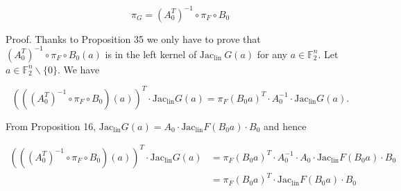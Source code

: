 \documentclass[10pt]{article}
\begin{document}
$$
\pi_{G}=\left(A_{0}^{T}\right)^{-1} \circ \pi_{F} \circ B_{0}
$$

Proof. Thanks to Proposition 35 we only have to prove that $\left(A_{0}^{T}\right)^{-1} \circ \pi_{F} \circ B_{0}(a)$ is in the left kernel of $\mathrm{Jac}_{\text {lin }} G(a)$ for any $a \in \mathbb{F}_{2}^{n}$. Let $a \in \mathbb{F}_{2}^{n} \backslash\{0\}$. We have

$$
\left(\left(\left(A_{0}^{T}\right)^{-1} \circ \pi_{F} \circ B_{0}\right)(a)\right)^{T} \cdot \mathrm{Jac}_{\mathrm{lin}} G(a)=\pi_{F}\left(B_{0} a\right)^{T} \cdot A_{0}^{-1} \cdot \mathrm{Jac}_{\mathrm{lin}} G(a) .
$$

From Proposition 16, $\mathrm{Jac}_{\operatorname{lin}} G(a)=A_{0} \cdot \mathrm{Jac}_{\operatorname{lin}} F\left(B_{0} a\right) \cdot B_{0}$ and hence

$$
\begin{aligned}
\left(\left(\left(A_{0}^{T}\right)^{-1} \circ \pi_{F} \circ B_{0}\right)(a)\right)^{T} \cdot \mathrm{Jac}_{\mathrm{lin}} G(a) & =\pi_{F}\left(B_{0} a\right)^{T} \cdot A_{0}^{-1} \cdot A_{0} \cdot \mathrm{Jac}_{\mathrm{lin}} F\left(B_{0} a\right) \cdot B_{0} \\
& =\pi_{F}\left(B_{0} a\right)^{T} \cdot \mathrm{Jac}_{\mathrm{lin}} F\left(B_{0} a\right) \cdot B_{0}
\end{aligned}
$$
\end{document}
